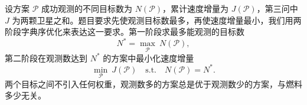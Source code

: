 设方案 $\mathcal P$ 成功观测的不同目标数为 $N(\mathcal P)$，累计速度增量为 $J(\mathcal P)$，第三问中 $J$ 为两颗卫星之和。题目要求先使观测目标数最多，再使速度增量最小，我们用两阶段字典序优化来表达这一要求。第一阶段求最多能观测的目标数
\begin{equation}
  N^* = \max_{\mathcal P}\ N(\mathcal P),
  \label{eq:lex1}
\end{equation}
第二阶段在观测数达到 $N^*$ 的方案中最小化速度增量
\begin{equation}
  \min_{\mathcal P}\ J(\mathcal P) \quad \text{s.t.}\quad N(\mathcal P) = N^* .
  \label{eq:lex2}
\end{equation}
两个目标之间不引入任何权重，观测数多的方案总是优于观测数少的方案，与燃料多少无关。
